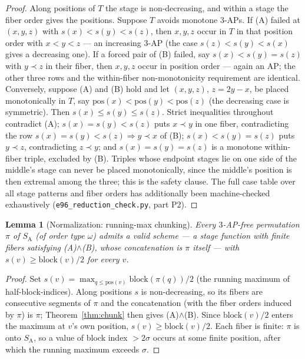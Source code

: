 \documentclass[11pt]{article}
\newtheorem{lemma}[theorem]{Lemma}
\theoremstyle{definition}
\newcommand{\SA}{S_{\mathrm{A}}}
\newcommand{\pos}{\mathrm{pos}}
\begin{document}
\begin{proof}
Along positions of $T$ the stage is non-decreasing, and within a stage the
fiber order gives the positions. Suppose $T$ avoids monotone $3$-APs. If
(A) failed at $(x,y,z)$ with $s(x)<s(y)<s(z)$, then $x,y,z$ occur in $T$ in
that position order with $x<y<z$ --- an increasing $3$-AP (the case
$s(z)<s(y)<s(x)$ gives a decreasing one). If a forced pair of (B) failed,
say $s(x)<s(y)=s(z)$ with $y \prec z$ in their fiber, then $x, y, z$ occur
in position order --- again an AP; the other three rows and the within-fiber
non-monotonicity requirement are identical. Conversely, suppose (A) and (B)
hold and let $(x,y,z)$, $z = 2y-x$, be placed monotonically in $T$, say
$\pos(x)<\pos(y)<\pos(z)$ (the decreasing case is symmetric). Then
$s(x) \le s(y) \le s(z)$. Strict inequalities throughout contradict (A);
$s(x)=s(y)<s(z)$ puts $x \prec y$ in one fiber, contradicting the row
$s(x)=s(y)<s(z) \Rightarrow y \prec x$ of (B); $s(x)<s(y)=s(z)$ puts
$y \prec z$, contradicting $z \prec y$; and $s(x)=s(y)=s(z)$ is a monotone
within-fiber triple, excluded by (B). Triples whose endpoint stages lie on
one side of the middle's stage can never be placed monotonically, since the
middle's position is then extremal among the three; this is the safety
clause. The full case table over all stage patterns and fiber orders has
additionally been machine-checked exhaustively
(\texttt{e96\_reduction\_check.py}, part P2).
\end{proof}

\begin{lemma}[Normalization: running-max chunking]\label{lem:normal}
Every $3$-AP-free permutation $\pi$ of $\SA$ (of order type $\omega$)
admits a valid scheme --- a stage function with finite fibers satisfying
(A)$\wedge$(B), whose concatenation is $\pi$ itself --- with
$s(v) \ge \mathrm{block}(v)/2$ for every $v$.
\end{lemma}

\begin{proof}
Set $s(v) = \max_{q \le \pos(v)} \mathrm{block}(\pi(q))/2$ (the running
maximum of half-block-indices). Along positions $s$ is non-decreasing, so
its fibers are consecutive segments of $\pi$ and the concatenation (with
the fiber orders induced by $\pi$) is $\pi$; Theorem~\ref{thm:chunk} then
gives (A)$\wedge$(B). Since $\mathrm{block}(v)/2$ enters the maximum at
$v$'s own position, $s(v) \ge \mathrm{block}(v)/2$. Each fiber is finite:
$\pi$ is onto $\SA$, so a value of block index $> 2\sigma$ occurs at some
finite position, after which the running maximum exceeds $\sigma$.
\end{proof}
\end{document}
